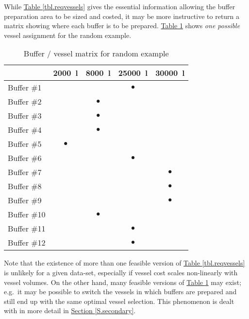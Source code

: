 While \hyperref[tbl.reqvessels]{Table \ref*{tbl.reqvessels}} gives the
essential information allowing the buffer preparation area to be sized and
costed, it may be more instructive to return a matrix showing where each buffer
is to be prepared. 
\hyperref[tbl.bvmatrix]{Table \ref*{tbl.bvmatrix}} shows \emph{one possible}
vessel assignment for the random example.

\begin{table}[t]
    \centering
    \caption{Buffer / vessel matrix for random example}
    \label{tbl.bvmatrix}
    \begin{tabular}{l | c | c | c | c }
        & \SI{2000}{\litre} & \SI{8000}{\litre} & \SI{25000}{\litre} &
        \SI{30000}{\litre}\\ \hline
        Buffer \#1  & & & $\bullet$ & \\
        Buffer \#2  & & $\bullet$ & & \\
        Buffer \#3  & & $\bullet$ & & \\
        Buffer \#4  & & $\bullet$ & & \\
        Buffer \#5  & $\bullet$ & & & \\
        Buffer \#6  & & & $\bullet$ & \\
        Buffer \#7  & & & & $\bullet$ \\
        Buffer \#8  & & & & $\bullet$ \\
        Buffer \#9  & & & & $\bullet$ \\
        Buffer \#10 & & $\bullet$ & & \\
        Buffer \#11 & & & $\bullet$ & \\
        Buffer \#12 & & & $\bullet$ & \\
    \end{tabular}
\end{table}

Note that the existence of more than one feasible version of 
\hyperref[tbl.reqvessels]{Table \ref*{tbl.reqvessels}} is unlikely for a given
data-set, especially if vessel cost scales non-linearly with vessel volumes.
On the other hand, many feasible versions of
\hyperref[tbl.bvmatrix]{Table \ref*{tbl.bvmatrix}} may exist; e.g.\ it may be
possible to switch the vessels in which buffers are prepared and still end up
with the same optimal vessel selection.
This phenomenon is dealt with in more detail in 
\hyperref[S.secondary]{Section \ref*{S.secondary}}.

